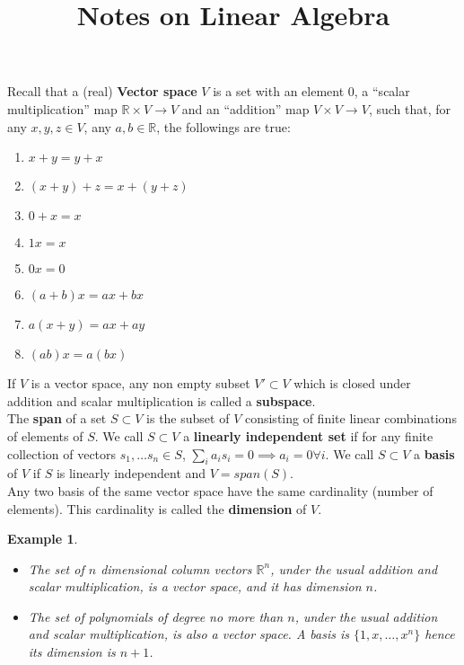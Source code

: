 \documentclass[20pt]{article} %
\title{Notes on Linear Algebra}
\theoremstyle{break}
\newtheorem{exa}[definition]{Example}
\begin{document}
\maketitle

Recall that a (real) {\bf Vector space} $V$ is a set with an element $0$, a ``scalar multiplication'' map $\mathbb{R}\times V\rightarrow V$ and an ``addition'' map $V\times V\rightarrow V$, such that, for any $x, y, z\in V$, any $a, b\in \mathbb{R}$, the followings are true:
\begin{enumerate}
\item $x+y=y+x$
\item $(x+y)+z=x+(y+z)$
\item $0+x=x$
\item $1x=x$
\item $0x=0$
\item $(a+b)x=ax+bx$
\item $a(x+y)=ax+ay$
\item $(ab)x=a(bx)$
\end{enumerate}

If $V$ is a vector space, any non empty subset $V'\subset V$ which is closed under addition and scalar multiplication is called a {\bf subspace}.\\

The {\bf span} of a set $S\subset V$ is the subset of $V$ consisting of finite linear combinations of elements of $S$. We call $S\subset V$ a {\bf linearly independent set} if for any finite collection of vectors $s_1, \dots s_n\in S$, $\sum_ia_is_i=0\implies a_i=0\forall i$. We call $S\subset V$ a {\bf basis} of $V$ if $S$ is linearly independent and $V=span(S)$.\\

Any two basis of the same vector space have the same cardinality (number of elements). This cardinality is called the {\bf dimension} of $V$.\\

\begin{exa}
  \begin{itemize}
  \item The set of $n$ dimensional column vectors $\mathbb{R}^n$, under the usual addition and scalar multiplication, is a vector space, and it has dimension $n$.
  \item The set of polynomials of degree no more than $n$, under the usual addition and scalar multiplication, is also a vector space. A basis is $\{1, x, \dots, x^n\}$ hence its dimension is $n+1$.
  \end{itemize}
\end{exa}
\end{document}
